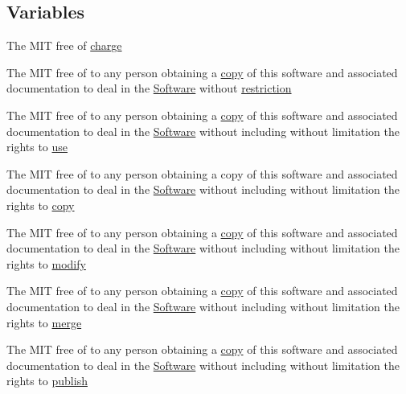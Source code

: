 \subsection*{Variables}
\begin{DoxyCompactItemize}
\item 
The M\+I\+T free of \hyperlink{license_8txt_aebc511ed3f15c16125b74aa0f22cfa10}{charge}
\item 
The M\+I\+T free of to any person obtaining a \hyperlink{license_8txt_aff1d4c6b756ebf691fa44a0904f68658}{copy} of this software and associated documentation to deal in the \hyperlink{license_8txt_a22a1529885b3e9d66b0c72fe604fc3dc}{Software} without \hyperlink{license_8txt_ac0e1e4a858a6a19c5392f7f6d29f969c}{restriction}
\item 
The M\+I\+T free of to any person obtaining a \hyperlink{license_8txt_aff1d4c6b756ebf691fa44a0904f68658}{copy} of this software and associated documentation to deal in the \hyperlink{license_8txt_a22a1529885b3e9d66b0c72fe604fc3dc}{Software} without including without limitation the rights to \hyperlink{license_8txt_ab8202310c90e99c59d9ea1f58f920a91}{use}
\item 
The M\+I\+T free of to any person obtaining a copy of this software and associated documentation to deal in the \hyperlink{license_8txt_a22a1529885b3e9d66b0c72fe604fc3dc}{Software} without including without limitation the rights to \hyperlink{license_8txt_aff1d4c6b756ebf691fa44a0904f68658}{copy}
\item 
The M\+I\+T free of to any person obtaining a \hyperlink{license_8txt_aff1d4c6b756ebf691fa44a0904f68658}{copy} of this software and associated documentation to deal in the \hyperlink{license_8txt_a22a1529885b3e9d66b0c72fe604fc3dc}{Software} without including without limitation the rights to \hyperlink{license_8txt_a4f5fee3fe655fc467fc80425521837ae}{modify}
\item 
The M\+I\+T free of to any person obtaining a \hyperlink{license_8txt_aff1d4c6b756ebf691fa44a0904f68658}{copy} of this software and associated documentation to deal in the \hyperlink{license_8txt_a22a1529885b3e9d66b0c72fe604fc3dc}{Software} without including without limitation the rights to \hyperlink{license_8txt_a7653d3ec339e97ccc64ec4f74e440441}{merge}
\item 
The M\+I\+T free of to any person obtaining a \hyperlink{license_8txt_aff1d4c6b756ebf691fa44a0904f68658}{copy} of this software and associated documentation to deal in the \hyperlink{license_8txt_a22a1529885b3e9d66b0c72fe604fc3dc}{Software} without including without limitation the rights to \hyperlink{license_8txt_ae6b6c4d3ae1a4140d31294e27bb0ebd8}{publish}

\end{DoxyCompactItemize}
